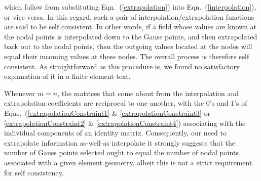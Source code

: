 which follow from substituting Eqn.~(\ref{extrapolation}) into Eqn.~(\ref{interpolation}), or vice versa.  In this regard, such a pair of interpolation\slash extrapolation functions are said to be self consistent. In other words, if a field whose values are known at the nodal points is interpolated down to the Gauss points, and then extrapolated back out to the nodal points, then the outgoing values located at the nodes will equal their incoming values at these nodes. The overall process is therefore self consistent.  As straight\-forward as this procedure is, we found no satisfactory explanation of it in a finite element text.

Whenever $m=n$, the matrices that come about from the interpolation and extrapolation coefficients are reciprocal to one another, with the 0's and 1's of Eqns.~(\ref{extrapolationConstraint1} \& \ref{extrapolationConstraint3} or \ref{extrapolationConstraint2} \& \ref{extrapolationConstraint4}) associating with the individual components of an identity matrix.  Consequently, our need to extrapolate information as-well-as interpolate it strongly suggests that the number of Gauss points selected ought to equal the number of nodal points associated with a given element geometry, albeit this is not a strict requirement for self consistency.

